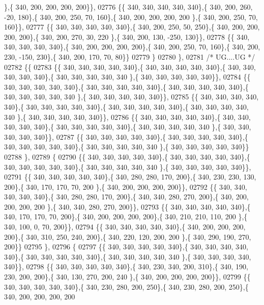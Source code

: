 \begin{DoxyCode}
      \},\{ 340, 200, 200, 200, 200\}\},
02776 \{\{ 340, 340, 340, 340, 340\},\{ 340, 200, 260, -20, 180\},\{ 340, 200, 250,  70, 160\},\{ 340, 200, 200, 200, 200
      \},\{ 340, 200, 250,  70, 160\}\},
02777 \{\{ 340, 340, 340, 340, 340\},\{ 340, 200, 250,  50, 250\},\{ 340, 200, 200, 200, 200\},\{ 340, 200, 270,  30, 220
      \},\{ 340, 200, 130, -250, 130\}\},
02778 \{\{ 340, 340, 340, 340, 340\},\{ 340, 200, 200, 200, 200\},\{ 340, 200, 250,  70, 160\},\{ 340, 200, 230, -150, 
      230\},\{ 340, 200, 170,  70,  80\}\}
02779 \}
02780 \},
02781 \textcolor{comment}{/* UG....UG */}
02782 \{\{
02783 \{\{ 340, 340, 340, 340, 340\},\{ 340, 340, 340, 340, 340\},\{ 340, 340, 340, 340, 340\},\{ 340, 340, 340, 340, 340
      \},\{ 340, 340, 340, 340, 340\}\},
02784 \{\{ 340, 340, 340, 340, 340\},\{ 340, 340, 340, 340, 340\},\{ 340, 340, 340, 340, 340\},\{ 340, 340, 340, 340, 340
      \},\{ 340, 340, 340, 340, 340\}\},
02785 \{\{ 340, 340, 340, 340, 340\},\{ 340, 340, 340, 340, 340\},\{ 340, 340, 340, 340, 340\},\{ 340, 340, 340, 340, 340
      \},\{ 340, 340, 340, 340, 340\}\},
02786 \{\{ 340, 340, 340, 340, 340\},\{ 340, 340, 340, 340, 340\},\{ 340, 340, 340, 340, 340\},\{ 340, 340, 340, 340, 340
      \},\{ 340, 340, 340, 340, 340\}\},
02787 \{\{ 340, 340, 340, 340, 340\},\{ 340, 340, 340, 340, 340\},\{ 340, 340, 340, 340, 340\},\{ 340, 340, 340, 340, 340
      \},\{ 340, 340, 340, 340, 340\}\}
02788 \},
02789 \{
02790 \{\{ 340, 340, 340, 340, 340\},\{ 340, 340, 340, 340, 340\},\{ 340, 340, 340, 340, 340\},\{ 340, 340, 340, 340, 340
      \},\{ 340, 340, 340, 340, 340\}\},
02791 \{\{ 340, 340, 340, 340, 340\},\{ 340, 280, 280, 170, 200\},\{ 340, 230, 230, 130, 200\},\{ 340, 170, 170,  70, 200
      \},\{ 340, 200, 200, 200, 200\}\},
02792 \{\{ 340, 340, 340, 340, 340\},\{ 340, 280, 280, 170, 200\},\{ 340, 340, 280, 270, 200\},\{ 340, 200, 200, 200, 200
      \},\{ 340, 340, 280, 270, 200\}\},
02793 \{\{ 340, 340, 340, 340, 340\},\{ 340, 170, 170,  70, 200\},\{ 340, 200, 200, 200, 200\},\{ 340, 210, 210, 110, 200
      \},\{ 340, 100,   0,  70, 200\}\},
02794 \{\{ 340, 340, 340, 340, 340\},\{ 340, 200, 200, 200, 200\},\{ 340, 310, 250, 240, 200\},\{ 340, 220, 120, 200, 200
      \},\{ 340, 290, 190, 270, 200\}\}
02795 \},
02796 \{
02797 \{\{ 340, 340, 340, 340, 340\},\{ 340, 340, 340, 340, 340\},\{ 340, 340, 340, 340, 340\},\{ 340, 340, 340, 340, 340
      \},\{ 340, 340, 340, 340, 340\}\},
02798 \{\{ 340, 340, 340, 340, 340\},\{ 340, 230, 340, 200, 310\},\{ 340, 190, 230, 200, 200\},\{ 340, 130, 270, 200, 240
      \},\{ 340, 200, 200, 200, 200\}\},
02799 \{\{ 340, 340, 340, 340, 340\},\{ 340, 230, 280, 200, 250\},\{ 340, 230, 280, 200, 250\},\{ 340, 200, 200, 200, 200

\end{DoxyCode}

